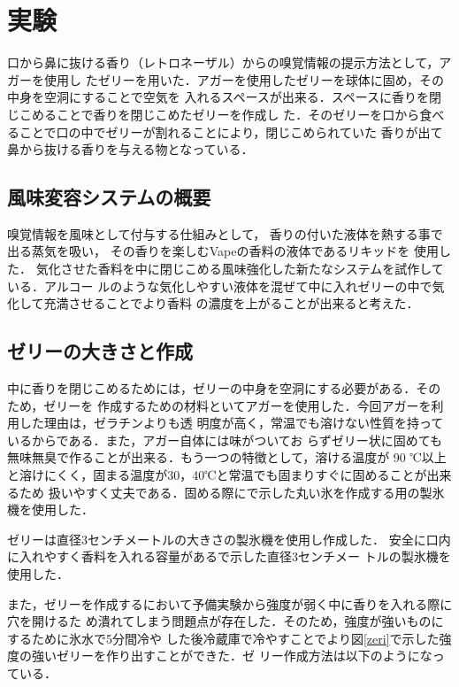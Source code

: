 \section{実験}

口から鼻に抜ける香り（レトロネーザル）からの嗅覚情報の提示方法として，アガーを使用し
たゼリーを用いた．アガーを使用したゼリーを球体に固め，その中身を空洞にすることで空気を
入れるスペースが出来る．スペースに香りを閉じこめることで香りを閉じこめたゼリーを作成し
た．そのゼリーを口から食べることで口の中でゼリーが割れることにより，閉じこめられていた
香りが出て鼻から抜ける香りを与える物となっている．

\subsection{風味変容システムの概要}

嗅覚情報を風味として付与する仕組みとして，
香りの付いた液体を熱する事で出る蒸気を吸い，
その香りを楽しむVapeの香料の液体であるリキッドを
使用した．
気化させた香料を中に閉じこめる風味強化した新たなシステムを試作している．アルコー
ルのような気化しやすい液体を混ぜて中に入れゼリーの中で気化して充満させることでより香料
の濃度を上がることが出来ると考えた．


\subsection{ゼリーの大きさと作成}

中に香りを閉じこめるためには，ゼリーの中身を空洞にする必要がある．そのため，ゼリーを
作成するための材料といてアガーを使用した．今回アガーを利用した理由は，ゼラチンよりも透
明度が高く，常温でも溶けない性質を持っているからである．また，アガー自体には味がついてお
らずゼリー状に固めても無味無臭で作ることが出来る．もう一つの特徴として，溶ける温度が 90
℃以上と溶けにくく，固まる温度が30，40℃と常温でも固まりすぐに固めることが出来るため
扱いやすく丈夫である．固める際にで示した丸い氷を作成する用の製氷機を使用した．


ゼリーは直径3センチメートルの大きさの製氷機を使用し作成した．
安全に口内に入れやすく香料を入れる容量があるで示した直径3センチメー
トルの製氷機を使用した．


また，ゼリーを作成するにおいて予備実験から強度が弱く中に香りを入れる際に穴を開けるた
め潰れてしまう問題点が存在した．そのため，強度が強いものにするために氷水で5分間冷や
した後冷蔵庫で冷やすことでより図\ref{zeri}で示した強度の強いゼリーを作り出すことができた．ゼ
リー作成方法は以下のようになっている．


